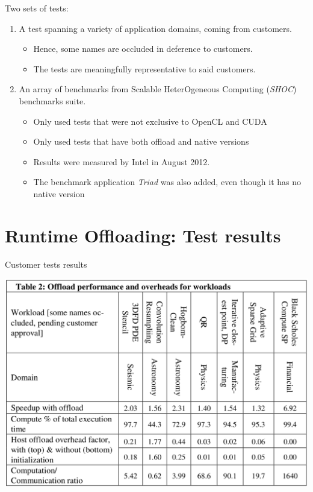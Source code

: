 \documentclass[screen]{beamer}
\begin{document}
\begin{frame}
    Two sets of tests:
    \begin{enumerate}[<+-| alert@+>]
        \item A test spanning a variety of application domains, coming from customers.
        \begin{itemize}
            \item Hence, some names are occluded in deference to customers.
            \item The tests are meaningfully representative to said customers.
        \end{itemize}
        \item An array of benchmarks from Scalable HeterOgeneous Computing (\textit{SHOC}) benchmarks suite.
        \begin{itemize}
            \item Only used tests that were not exclusive to OpenCL and CUDA
            \item Only used tests that have both offload and native versions
            \item Results were measured by Intel in August 2012.
            \item The benchmark application \textit{Triad} was also added, even though it has no native version
        \end{itemize}
    \end{enumerate}
\end{frame}

\section{Runtime Offloading: Test results}

\begin{frame}{Customer tests results}
    \begin{center}
        \includegraphics[width=0.65\linewidth]{table2.png}
    \end{center}
\end{frame}
\end{document}
